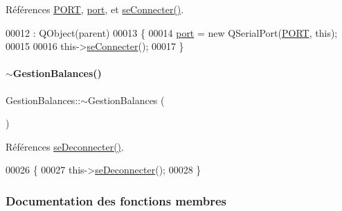 Références \hyperlink{_gestion_balances_8h_a614217d263be1fb1a5f76e2ff7be19a2}{P\+O\+RT}, \hyperlink{class_gestion_balances_a7e40205180eb65dab0b5cdebd628f794}{port}, et \hyperlink{class_gestion_balances_ac3bb603b39f9b89732da2dc576903924}{se\+Connecter()}.


\begin{DoxyCode}
00012                                                 : QObject(parent)
00013 \{
00014     \hyperlink{class_gestion_balances_a7e40205180eb65dab0b5cdebd628f794}{port} = \textcolor{keyword}{new} QSerialPort(\hyperlink{_gestion_balances_8h_a614217d263be1fb1a5f76e2ff7be19a2}{PORT}, \textcolor{keyword}{this});
00015 
00016     this->\hyperlink{class_gestion_balances_ac3bb603b39f9b89732da2dc576903924}{seConnecter}();
00017 \}
\end{DoxyCode}
\mbox{\label{class_gestion_balances_a6cb93817424cba3ac1f1593f5948d2ee}} 
\paragraph{\texorpdfstring{$\sim$\+Gestion\+Balances()}{~GestionBalances()}}
{\footnotesize\ttfamily Gestion\+Balances\+::$\sim$\+Gestion\+Balances (\begin{DoxyParamCaption}{ }\end{DoxyParamCaption})}



Références \hyperlink{class_gestion_balances_a25880f41779aa8fdeac7ae972b09ff36}{se\+Deconnecter()}.


\begin{DoxyCode}
00026 \{
00027     this->\hyperlink{class_gestion_balances_a25880f41779aa8fdeac7ae972b09ff36}{seDeconnecter}();
00028 \}
\end{DoxyCode}


\subsubsection{Documentation des fonctions membres}
\mbox{\label{class_gestion_balances_a4c59a33f55b0c97f0ea4fb63b7791c0c}} 

